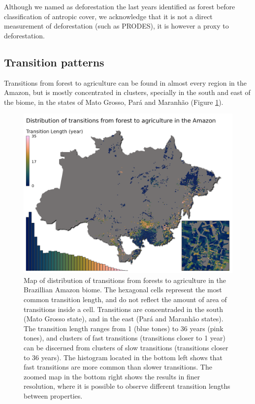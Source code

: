 \documentclass[essd, manuscript]{copernicus}
\begin{document}
Although we named as deforestation the last years identified as forest before classification of antropic cover, we acknowledge that it is not a direct measurement of deforestation (such as PRODES), it is however a proxy to deforestation.

\subsection{Transition patterns}

Transitions from forest to agriculture can be found in almost every region in the Amazon, but is mostly concentrated in clusters, specially in the south and east of the biome, in the states of Mato Grosso, Pará and Maranhão (Figure \ref{fig:map-plot}).

\begin{figure}[ht]
\includegraphics[width=17cm]{figs/map} \caption{Map of distribution of transitions from forests to agriculture in the Brazillian Amazon biome. The hexagonal cells represent the most common transition length, and do not reflect the amount of area of transitions inside a cell. Transitions are concentraded in the south (Mato Grosso state), and in the east (Pará and Maranhão states). The transition length ranges from 1 (blue tones) to 36 years (pink tones), and clusters of fast transitions (transitions closer to 1 year) can be discerned from clusters of slow transitions (transitions closer to 36 years). The histogram located in the bottom left shows that fast transitions are more common than slower transitions. The zoomed map in the bottom right shows the results in finer resolution, where it is possible to observe different transition lengths between properties.}\label{fig:map-plot}
\end{figure}
\end{document}
